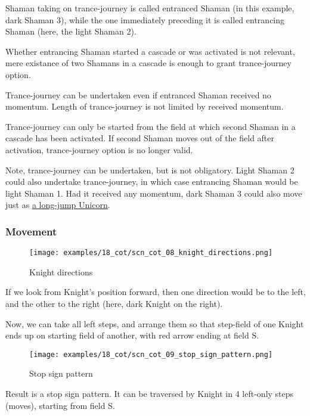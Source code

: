 Shaman taking on trance-journey is called entranced Shaman (in this example,
dark Shaman 3), while the one immediately preceding it is called entrancing
Shaman (here, the light Shaman 2).

Whether entrancing Shaman started a cascade or was activated is not relevant,
mere existance of two Shamans in a cascade is enough to grant trance-journey
option.

Trance-journey can be undertaken even if entranced Shaman received no momentum.
Length of trance-journey is not limited by received momentum.

Trance-journey can only be started from the field at which second Shaman in a
cascade has been activated. If second Shaman moves out of the field after
activation, trance-journey option is no longer valid.

Note, trance-journey can be undertaken, but is not obligatory. Light Shaman 2
could also undertake trance-journey, in which case entrancing Shaman would be
light Shaman 1.
Had it received any momentum, dark Shaman 3 could also move just as
\hyperref[fig:scn_cot_04_dark_shaman_step_ply]{a long-jump Unicorn}.

\clearpage %

\subsubsection*{Movement}

\noindent
\begin{wrapfigure}[10]{l}{0.4\textwidth} %
\centering
\texttt{[image: examples/18\_cot/scn\_cot\_08\_knight\_directions.png]}
\caption{Knight directions}
\label{fig:scn_cot_08_knight_directions}
\end{wrapfigure}
If we look from Knight's position forward, then one direction would be to
the left, and the other to the right (here, dark Knight on the right).

Now, we can take all left steps, and arrange them so that step-field of one
Knight ends up on starting field of another, with red arrow ending at field S.


\vspace*{0.10\textheight}
\noindent
\begin{wrapfigure}[12]{l}{0.4\textwidth} %
\centering
\texttt{[image: examples/18\_cot/scn\_cot\_09\_stop\_sign\_pattern.png]}
\caption{Stop sign pattern}
\label{fig:scn_cot_09_stop_sign_pattern}
\end{wrapfigure}
Result is a stop sign pattern. It can be traversed by Knight in 4 left-only
steps (moves), starting from field S.

